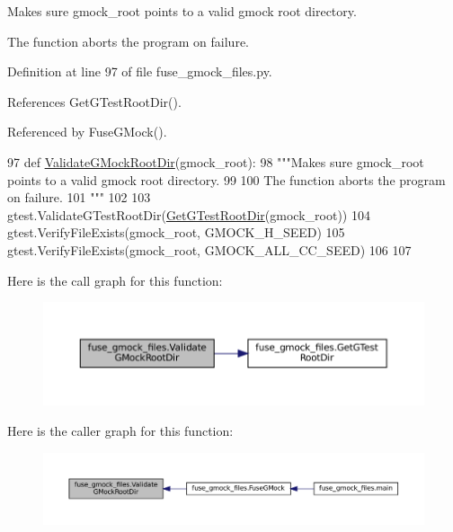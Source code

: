 \begin{DoxyVerb}Makes sure gmock_root points to a valid gmock root directory.

The function aborts the program on failure.
\end{DoxyVerb}
 

Definition at line 97 of file fuse\+\_\+gmock\+\_\+files.\+py.



References Get\+G\+Test\+Root\+Dir().



Referenced by Fuse\+G\+Mock().


\begin{DoxyCode}
97 \textcolor{keyword}{def }\hyperlink{namespacefuse__gmock__files_aaec09f55a62b3d65b5d25fe0050e9e05}{ValidateGMockRootDir}(gmock\_root):
98   \textcolor{stringliteral}{"""Makes sure gmock\_root points to a valid gmock root directory.}
99 \textcolor{stringliteral}{}
100 \textcolor{stringliteral}{  The function aborts the program on failure.}
101 \textcolor{stringliteral}{  """}
102 
103   gtest.ValidateGTestRootDir(\hyperlink{namespacefuse__gmock__files_aae591d77d2d969394996f9fc2017824c}{GetGTestRootDir}(gmock\_root))
104   gtest.VerifyFileExists(gmock\_root, GMOCK\_H\_SEED)
105   gtest.VerifyFileExists(gmock\_root, GMOCK\_ALL\_CC\_SEED)
106 
107 
\end{DoxyCode}
Here is the call graph for this function\+:
\nopagebreak
\begin{figure}[H]
\begin{center}
\leavevmode
\includegraphics[width=350pt]{namespacefuse__gmock__files_aaec09f55a62b3d65b5d25fe0050e9e05_cgraph}
\end{center}
\end{figure}
Here is the caller graph for this function\+:
\nopagebreak
\begin{figure}[H]
\begin{center}
\leavevmode
\includegraphics[width=350pt]{namespacefuse__gmock__files_aaec09f55a62b3d65b5d25fe0050e9e05_icgraph}
\end{center}
\end{figure}
\mbox{\label{namespacefuse__gmock__files_a68581e210793099d656537faa719df29}} 
